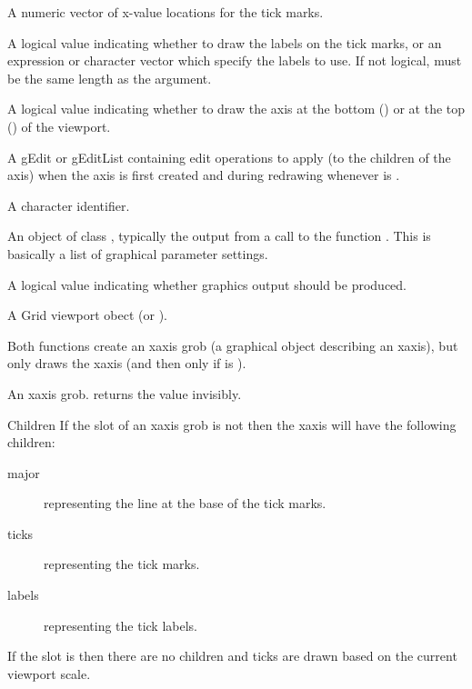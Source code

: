 %
\begin{Arguments}
\begin{ldescription}
\item[\code{at}] A numeric vector of x-value locations for the tick marks.
\item[\code{label}] A logical value indicating whether to draw the labels
on the tick marks, or an expression or character vector which
specify the labels to use.  If not logical, must be the same
length as the  argument.
\item[\code{main}] A logical value indicating whether to draw the axis
at the bottom () or at the top () of the
viewport.
\item[\code{edits}] A gEdit or gEditList containing edit operations
to apply (to the children of the axis)
when the axis is first created and during redrawing
whenever  is .

\item[\code{name}]  A character identifier. 
\item[\code{gp}] An object of class , typically the output
from a call to the function .  This is basically
a list of graphical parameter settings.
\item[\code{draw}] A logical value indicating whether graphics output
should be produced.
\item[\code{vp}] A Grid viewport obect (or ).
\end{ldescription}
\end{Arguments}
%
\begin{Details}\relax
Both functions create an xaxis grob (a graphical object describing an
xaxis), but only 
draws the xaxis (and then only if  is ).
\end{Details}
%
\begin{Value}
An xaxis grob.   returns the value invisibly.
\end{Value}
%
\begin{Section}{Children}
If the  slot of an xaxis grob is not  then
the xaxis will have the following children:
\begin{description}

\item[major]  representing the line at the base of the
tick marks.
\item[ticks] representing the tick marks.
\item[labels] representing the tick labels.

\end{description}


If the  slot is  then there are no children
and ticks are drawn based on the current viewport scale.
\end{Section}
